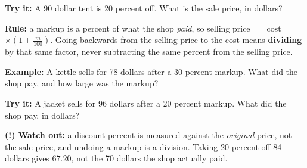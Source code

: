 \documentclass[12pt]{article}
\begin{document}
\begin{tryitbox}
\textbf{Try it:} \quad A 90 dollar tent is 20 percent off. What is the sale
price, in dollars?\\[2pt]
\end{tryitbox}


\begin{formulabox}
\textbf{Rule:} a markup is a percent of what the shop \emph{paid}, so
selling price $= $ cost $\times \left(1 + \frac{m}{100}\right)$. Going backwards
from the selling price to the cost means \textbf{dividing} by that same factor,
never subtracting the same percent from the selling price.
\end{formulabox}

\begin{examplebox}
\textbf{Example:} \quad A kettle sells for 78 dollars after a 30 percent markup.
What did the shop pay, and how large was the markup?
\end{examplebox}

\begin{tryitbox}
\textbf{Try it:} \quad A jacket sells for 96 dollars after a 20 percent markup.
What did the shop pay, in dollars?\\[2pt]
\end{tryitbox}

\begin{watchoutbox}
\textbf{(!) Watch out:} a discount percent is measured against the
\emph{original} price, not the sale price, and undoing a markup is a division.
Taking 20 percent off 84 dollars gives $67.20$, not the 70 dollars the shop
actually paid.
\end{watchoutbox}
\end{document}
